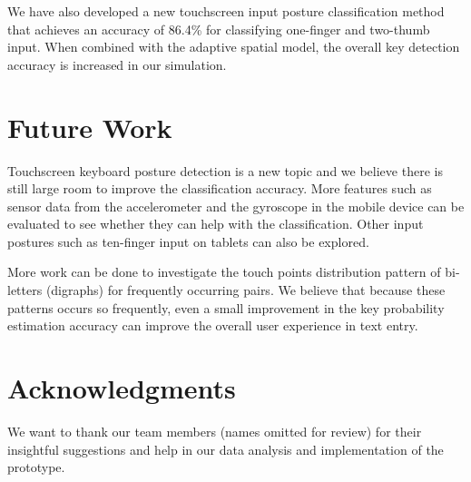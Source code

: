 \documentclass{sigchi}
\begin{document}
We have also developed a new touchscreen input posture classification method
that achieves an accuracy of 86.4\% for classifying one-finger and two-thumb input. When
combined with the adaptive spatial model, the overall key detection accuracy is increased
in our simulation.

\section{Future Work}
Touchscreen keyboard posture detection is a new topic and we believe there is still
large room to improve the classification accuracy. More features such as sensor data from 
the accelerometer and the gyroscope in the mobile device can be evaluated to see whether
they can help with the classification. Other input postures such as ten-finger input
on tablets can also be explored.

More work can be done to investigate the touch points distribution pattern of bi-letters (digraphs) 
for frequently occurring pairs. We believe that because these patterns occurs so frequently, even
a small improvement in the key probability estimation accuracy can improve the overall
user experience in text entry.  

\section{Acknowledgments}
We want to thank our team members (names omitted for review) for their insightful
suggestions and help in  our data analysis and implementation of the prototype. 

\balance



\end{document}
